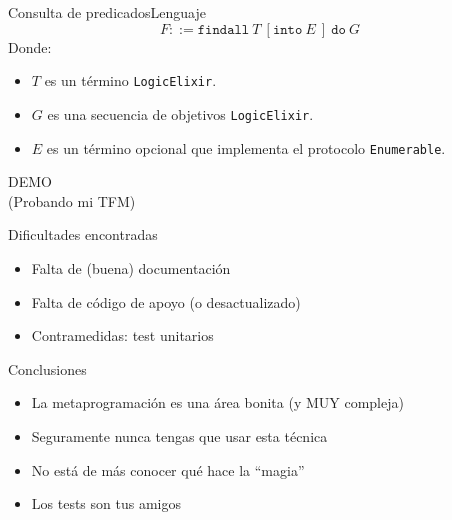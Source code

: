 \documentclass[14pt,aspectratio=169]{beamer}
\begin{document}
\begin{frame}{Consulta de predicados}{Lenguaje}
  \begin{equation*}
    F ::= \texttt{findall}\ T\ [\texttt{into}\ E\ ]\ \texttt{do}\ G
  \end{equation*}
  Donde:
  \begin{itemize}
    \item $T$ es un término \texttt{LogicElixir}.
    \item $G$ es una secuencia de objetivos \texttt{LogicElixir}.
    \item $E$ es un término opcional que implementa el protocolo \texttt{Enumerable}.
  \end{itemize}
\end{frame}

\begin{frame}
  \centering
  \huge
  DEMO\\
  \large
  (Probando mi TFM)
\end{frame}

\begin{frame}{Dificultades encontradas}
  \begin{itemize}
    \item Falta de (buena) documentación
    \item Falta de código de apoyo (o desactualizado)
    \item Contramedidas: test unitarios
  \end{itemize}
\end{frame}

\begin{frame}{Conclusiones}
  \begin{itemize}
    \item La metaprogramación es una área bonita (y MUY compleja)
    \item Seguramente nunca tengas que usar esta técnica
    \item No está de más conocer qué hace la ``magia''
    \item Los tests son tus amigos
  \end{itemize}
\end{frame}
\end{document}
